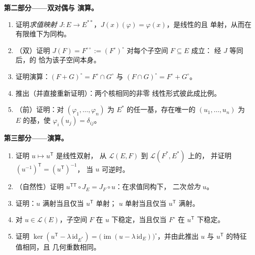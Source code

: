 \begin{problem}
\medskip
\noindent\textbf{第二部分——双对偶与
演算。}
\begin{enumerate}[resume]
  \item 证明\emph{求值映射} $J \colon E \to
        E^{**}$，$J(x)(\varphi) = \varphi(x)$，是线性的且
        单射，从而在有限维下为同构。
  \item （双）证明 $J(F) = F^{\circ\circ} :=
        (F^\circ)^\circ$ 对每个子空间 $F \subseteq E$ 成立：
        经 $J$ 等同后，的
        恰为该子空间本身。
  \item 证明演算：$(F + G)^\circ = F^\circ
        \cap G^\circ$ 与 $(F \cap G)^\circ = F^\circ + G^\circ$。
  \item 推出（并直接重新证明）：两个核相同的非零
        线性形式彼此成比例。
  \item （前）证明：对 $(\varphi_1,
        \dots, \varphi_n)$ 为 $E^*$ 的任一基，存在唯一的
        $(u_1, \dots, u_n)$ 为 $E$ 的基，使 $\varphi_i(u_j) =
        \delta_{ij}$。
\end{enumerate}

\medskip
\noindent\textbf{第三部分——演算。}
\begin{enumerate}[resume]
  \item 证明 $u \mapsto u^{\mathsf T}$ 是线性双射，
        从 $\mathcal{L}(E, F)$ 到 $\mathcal{L}(F^*, E^*)$ 上的，
        并证明 $(u^{-1})^{\mathsf T} = (u^{\mathsf T})^{-1}$，
        当 $u$ 可逆时。
  \item （自然性）证明 $u^{\mathsf T\mathsf T} \circ J_E
        = J_F \circ u$：在求值同构下，
        二次\emph{恰为} $u$。
  \item 证明：$u$ 满射当且仅当 $u^{\mathsf T}$ 单射；
        $u$ 单射当且仅当 $u^{\mathsf T}$ 满射。
  \item 对 $u \in \mathcal{L}(E)$，子空间 $F$ 在
        $u$ 下稳定，当且仅当 $F^\circ$ 在
        $u^{\mathsf T}$ 下稳定。
  \item 证明 $\ker(u^{\mathsf T} - \lambda\,
        \mathrm{id}_{E^*}) = \bigl(\operatorname{im}(u - \lambda\,
        \mathrm{id}_E)\bigr)^\circ$，并由此推出 $u$ 与
        $u^{\mathsf T}$ 的特征值相同，且
        几何重数相同。
\end{enumerate}


\end{problem}
